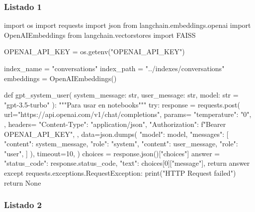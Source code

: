\subsubsection{Listado 1}
\label{anexo:code-4-1-11-1}

\begin{APACode}
import os
import requests
import json
from langchain.embeddings.openai import OpenAIEmbeddings
from langchain.vectorstores import FAISS

OPENAI_API_KEY = os.getenv("OPENAI_API_KEY")

index_name = "conversations"
index_path = "../indexes/conversations"
embeddings = OpenAIEmbeddings()

def gpt_system_user(
    system_message: str, user_message: str, model: str = "gpt-3.5-turbo"
):
    """Para usar en notebooks"""
    try:
        response = requests.post(
            url="https://api.openai.com/v1/chat/completions",
            params={
                "temperature": "0",
            },
            headers={
                "Content-Type": "application/json",
                "Authorization": f"Bearer {OPENAI_API_KEY}",
            },
            data=json.dumps(
                {
                    "model": model,
                    "messages": [
                        {"content": system_message, "role": "system"},
                        {"content": user_message, "role": "user"},
                    ]
                }
            ),
            timeout=10,
        )
        choices = response.json()["choices"]
        answer = {
            "status_code": response.status_code,
            "text": choices[0]["message"],
        }
        return answer
    except requests.exceptions.RequestException:
        print("HTTP Request failed")
        return None
\end{APACode}

\subsubsection{Listado 2}
\label{anexo:code-4-1-11-2}

